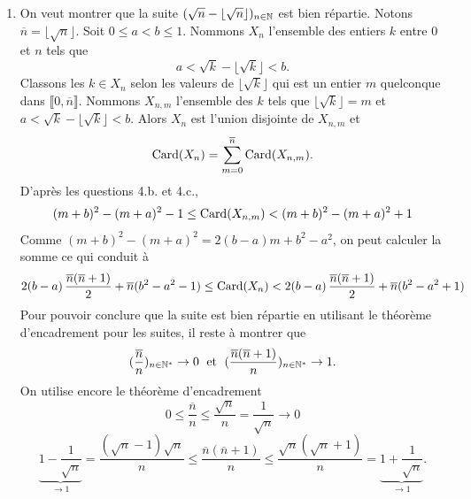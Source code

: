 \begin{enumerate}
\begin{enumerate}
    \item On veut montrer que la suite $(\sqrt{n} - \lfloor \sqrt{n} \rfloor)_{n \in \mathbb{N}}$ est bien répartie. Notons $\overline{n} = \lfloor \sqrt{n} \rfloor$.\newline
Soit $0 \leq a < b \leq 1$. Nommons $X_n$ l'ensemble des entiers $k$ entre $0$ et $n$ tels que 
\[
  a < \sqrt{k} - \lfloor \sqrt{k} \rfloor < b.
\]
Classons les $k \in X_n$ selon les valeurs de $\lfloor \sqrt{k} \rfloor$ qui est un entier $m$ quelconque dans $\llbracket 0, \overline{n}\rrbracket$. Nommons $X_{n,m}$ l'ensemble des $k$ tels que $\lfloor \sqrt{k} \rfloor = m$ et $a < \sqrt{k} - \lfloor \sqrt{k} \rfloor < b$.\newline
Alors $X_n$ est l'union disjointe de $X_{n,m}$ et 
\[
  \operatorname{Card}(X_n) = \sum_{m=0}^{\overline{n}} \operatorname{Card}(X_{n,m}).
\]
D'après les questions 4.b. et 4.c.,
\[
 (m+b)^2 - (m+a)^2 -1 \leq \operatorname{Card}(X_{n,m}) < (m+b)^2 - (m+a)^2 + 1
\]
Comme $(m+b)^2 - (m+a)^2 = 2(b-a)m + b^2 - a^2$, on peut calculer la somme ce qui conduit à
\[
  2(b-a)\,\frac{\overline{n}(\overline{n}+1)}{2} + \overline{n}(b^2 - a^2 - 1) \leq \operatorname{Card}(X_n) < 2(b-a)\,\frac{\overline{n}(\overline{n}+1)}{2} + \overline{n}(b^2 - a^2 + 1)
\]
Pour pouvoir conclure que la suite est bien répartie en utilisant le théorème d'encadrement pour les suites, il reste à montrer que 
\[
  (\frac{\overline{n}}{n})_{n\in \mathbb{N}^*}\rightarrow 0 \;\text{ et } \;(\frac{\overline{n}(\overline{n}+1)}{n})_{n\in \mathbb{N}^*}\rightarrow 1.
\]
On utilise encore le théorème d'encadrement
\[
  0 \leq \frac{\overline{n}}{n} \leq \frac{\sqrt{n}}{n} = \frac{1}{\sqrt{n}}\rightarrow0
\]
\[
  \underset{\rightarrow 1}{\underbrace{1 - \frac{1}{\sqrt{n}}}} = \frac{(\sqrt{n}-1)\sqrt{n}}{n}
  \leq \frac{\overline{n}(\overline{n}+1)}{n} 
  \leq \frac{\sqrt{n}(\sqrt{n}+1)}{n} = \underset{\rightarrow 1}{\underbrace{1 + \frac{1}{\sqrt{n}}}}.
\]

  \end{enumerate}

\end{enumerate}

